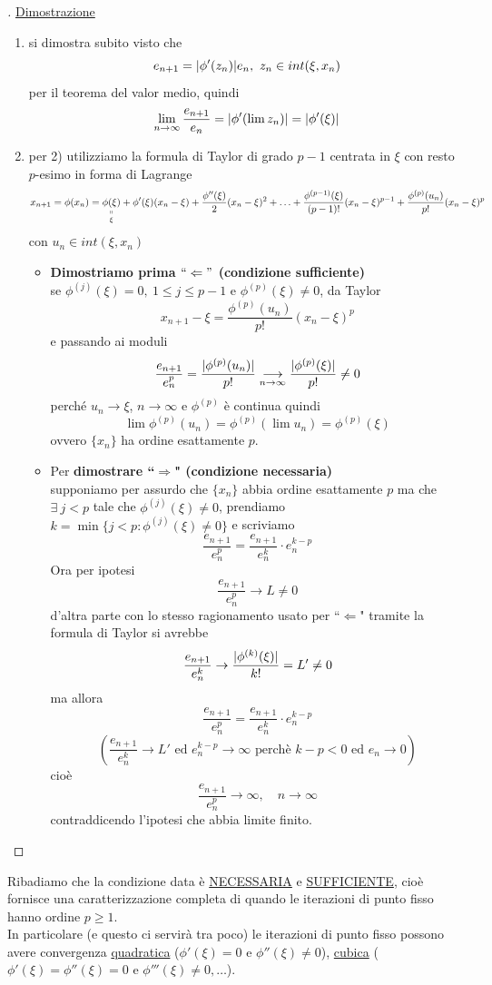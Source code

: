 \documentclass[12pt]{article}
\DeclarePairedDelimiter{\abs}{\lvert}{\rvert}
\begin{document}
\begin{proof}[\unskip\nopunct]
\uline{Dimostrazione}
\begin{enumerate}
    \item si dimostra subito visto che 
        \[e_{n+1}=\abs{\phi'(z_n)}e_n, \ z_n \in int(\xi,x_n)\]
        per il teorema del valor medio, quindi 
        \[\lim_{n\to\infty} \frac{e_{n+1}}{e_n} = \abs{\phi'(\lim z_n)}=\abs{\phi'(\xi)}\]
    \item per 2) utilizziamo la formula di Taylor di grado $p-1$ centrata in $\xi$ con resto $p$-esimo in forma di Lagrange \\
\[x_{n+1}=\phi(x_n)=\underset{\xi}{\underset{\shortparallel}{\phi(\xi)}}+ \phi'(\xi)(x_n-\xi)+\frac{\phi''(\xi)}{2}(x_n-\xi)^2+\dotso+\frac{\phi^{(p-1)}(\xi)}{(p-1)!}(x_n-\xi)^{p-1}+\frac{\phi^{(p)}(u_n)}{p!}(x_n-\xi)^p\]
con $u_n \in int(\xi,x_n)$\\
\begin{itemize}
\item \textbf{Dimostriamo prima $``\Leftarrow"$ (condizione sufficiente)}\\
se $\phi^{(j)}(\xi)=0, \ 1\leq j \leq p-1$ e $\phi^{(p)}(\xi)\neq 0$, da Taylor 
\[x_{n+1}-\xi=\frac{\phi^{(p)}(u_n)}{p!}(x_n-\xi)^p\]
e passando ai moduli
\[\frac{e_{n+1}}{e_n^p}=\frac{\abs{\phi^{(p)}(u_n)}}{p!}\underset{n\to\infty}{\longrightarrow}\frac{\abs{\phi^{(p)}(\xi)}}{p!}\neq 0\]
perché $u_n\rightarrow \xi$, $n\to\infty$ e $\phi^{(p)}$ è continua quindi 
\[\lim \phi^{(p)}(u_n)=\phi^{(p)}(\lim u_n)=\phi^{(p)}(\xi)\]
ovvero $\{x_n\}$ ha ordine esattamente $p$. \\
\item Per \textbf{dimostrare ``$\Rightarrow$" (condizione necessaria)}\\ 
supponiamo per assurdo che $\{ x_n \}$ abbia ordine esattamente $p$ ma che $\exists\ j<p$ tale che $\phi^{(j)}(\xi)\neq 0 $, prendiamo $k=\min\{ j<p:\phi^{(j)}(\xi)\neq0\}$ e scriviamo 
\[\frac{e_{n+1}}{e_n^p} = \frac{e_{n+1}}{e_n^k}\cdot e_n^{k-p}\]
Ora per ipotesi
\[\frac{e_{n+1}}{e_n^p}\rightarrow L \neq 0 \]
d'altra parte con lo stesso ragionamento usato per ``$\Leftarrow$" tramite la formula di Taylor si avrebbe
\[\frac{e_{n+1}}{e_n^k}\to \frac{\abs{\phi^{(k)}(\xi)}}{k!}=L'\neq 0\] 
ma allora
\[\frac{e_{n+1}}{e_n^p} = \frac{e_{n+1}}{e_n^k}\cdot e_n^{k-p}\]
\[\left( \frac{e_{n+1}}{e_n^k} \to L' \text{ ed } e_n^{k-p} \to \infty \text{ perchè } k-p<0 \text{ ed } e_n \to 0 \right) \]
cioè 
\[\frac{e_{n+1}}{e_n^p} \to \infty, \quad n \to \infty\]
contraddicendo l'ipotesi che abbia limite finito.
\end{itemize}
\end{enumerate}
\end{proof}
\bigskip
Ribadiamo che la condizione data è \uline{NECESSARIA} e \uline{SUFFICIENTE}, cioè fornisce una caratterizzazione completa di quando le iterazioni di punto fisso hanno ordine $p \geq 1$.\\
In particolare (e questo ci servirà tra poco) le iterazioni di punto fisso possono avere convergenza \uline{quadratica} ($\phi'(\xi)=0$ e $\phi''(\xi)\ne 0$), \uline{cubica} ($\phi'(\xi)=\phi''(\xi)=0$ e $\phi'''(\xi)\ne0, \dotso$).
\end{document}
